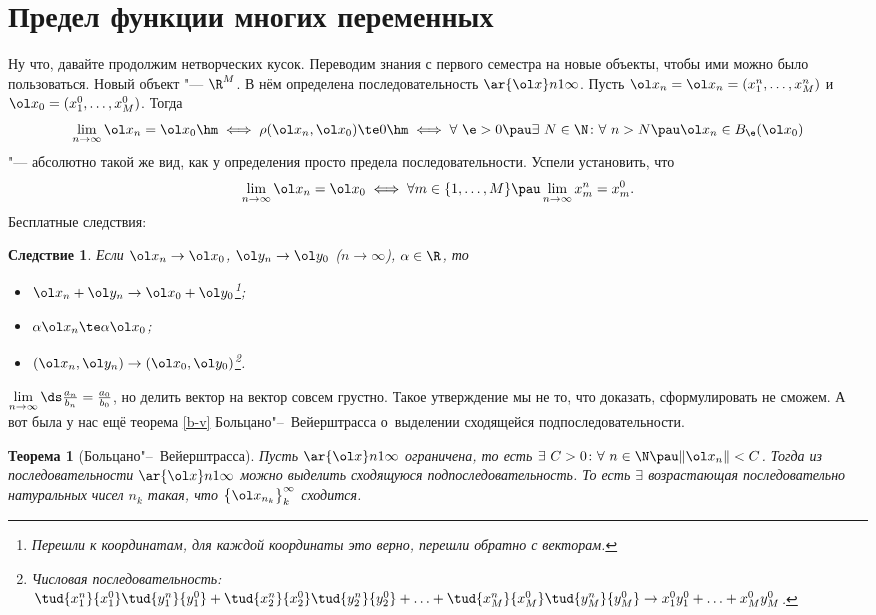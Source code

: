 \documentclass[a4paper,10pt,twoside]{article}
\newtheorem{The}{Теорема}[section]
\newtheorem{Sl}{Следствие}[section]
\let\AVsection\section{}
\renewcommand\section{\newpage\scol\AVsection}
\newcommand{\scol}{  \renewcommand{\headrulewidth}{0.5pt}\fancyhead[RE,LO]{\thesection{} \leftmark} \fancyhead[LE,RO]{\thepage}}
\begin{document}
	 \section{Предел функции многих переменных}
	 Ну что, давайте продолжим нетворческих кусок. Переводим знания с первого семестра на новые объекты, чтобы ими можно было пользоваться.
	 Новый объект "--- $\R^M$. В нём определена последовательность $\ar {\ol x}n1\infty$. 
	 Пусть $\ol x_n = \ol x_n = (x_1^n,\ldots,x_M^n)$ и $\ol x_0 = (x_1^0,\ldots,x_M^0)$.
	 Тогда \[\lim\limits_{n\to \infty}\ol x_n = \ol x_0\hm\iff \rho(\ol x_n,\ol x_0)\te0\hm\iff\forall\ \e > 0 \pau\exists \ N\in\N\colon \forall\ n> N \pau \ol x_n\in B_\e(\ol x_0)\] "---
	 абсолютно такой же вид, как у определения просто предела последовательности.
	 Успели установить, что \[\lim\limits_{n\to \infty} \ol x_n = \ol x_0 \iff \forall m\in\{1,\ldots,M\}\pau
	 \lim\limits_{n\to \infty}x_m^n = x_m^0.\]
	 Бесплатные следствия:
	 \begin{Sl}
	 Если $\ol x_n\to \ol x_0$, $\ol y_n\to \ol y_0$ ($n\to \infty$), $\alpha\in\R$, то 
	 \begin{itemize}
	   \item [а)] $\ol x_n + \ol y_n\to \ol x_0 +\vphantom{\te}\ol y_0$\footnote{Перешли к координатам, для каждой координаты
	   это верно, перешли обратно с векторам.};
	   \item [б)] $\alpha \ol x_n\te\alpha\ol x_0$;
	   \item [в)] $(\ol x_n,\ol y_n)\to (\ol x_0,\ol y_0)$\footnote{Числовая 
	   последовательность: $\tud{x_1^n}{x_1^0}\tud{y_1^n}{y_1^0}+\tud{x_2^n}{x_2^0}\tud{y_2^n}{y_2^0}+\ldots+\tud{x_M^n}{x_M^0}\tud{y_M^n}{y_M^0}\to x_1^0y_1^0 + \ldots + x_M^0y_M^0$.}.
	 \end{itemize}
	 \end{Sl}
	 $\lim\limits_{n\to \infty}\ds\frac{a_n}{b_n} = \frac{a_0}{b_0}$, но делить вектор на вектор совсем грустно. Такое утверждение мы не то, что доказать, сформулировать
	 не сможем. А вот была у нас ещё теорема \ref{b-v} Больцано"--~Вейерштрасса о~выделении сходящейся подпоследовательности.
	 \begin{The}[Больцано"--~Вейерштрасса]\label{B-V}
	 Пусть $\ar {\ol x}n1\infty$ ограничена, то есть $\exists\ C>0\colon \forall\ n\in\N\pau \|\ol x_n\|<C$.
	 Тогда из последовательности $\ar{\ol x}n1\infty$ можно выделить сходящуюся подпоследовательность.
	 То есть $\exists$ возрастающая последовательно натуральных чисел $n_k$ такая, что $\big\{\ol x_{n_k}\big\}_k^\infty$
	 сходится.
	 \end{The}
\end{document}
